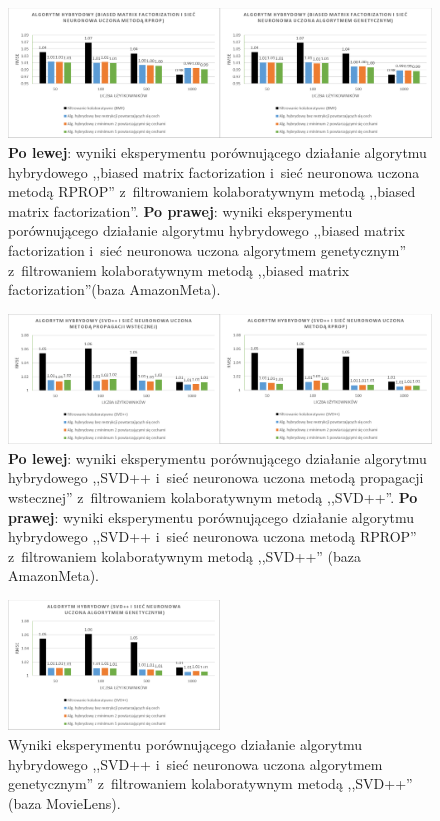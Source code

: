 \documentclass[twoside]{iisthesis}
\begin{document}
		\begin{figure}
			\centering
			\includegraphics[width=1\textwidth]{am_exphybrid2_3}			
			\caption{\textbf{Po lewej}: wyniki eksperymentu porównującego działanie algorytmu hybrydowego ,,biased matrix factorization i~sieć neuronowa uczona metodą RPROP'' z~filtrowaniem kolaboratywnym metodą ,,biased matrix factorization''. \textbf{Po prawej}: wyniki eksperymentu porównującego działanie algorytmu hybrydowego ,,biased matrix factorization i~sieć neuronowa uczona algorytmem genetycznym'' z~filtrowaniem kolaboratywnym metodą ,,biased matrix factorization''(baza AmazonMeta).}
			\label{fig:am_exphybrid2_3}
		\end{figure}
		
		\begin{figure}
			\centering
			\includegraphics[width=1\textwidth]{am_exphybrid2_4}			
			\caption{\textbf{Po lewej}: wyniki eksperymentu porównującego działanie algorytmu hybrydowego ,,SVD++ i~sieć neuronowa uczona metodą propagacji wstecznej'' z~filtrowaniem kolaboratywnym metodą ,,SVD++''. \textbf{Po prawej}: wyniki eksperymentu porównującego działanie algorytmu hybrydowego ,,SVD++ i~sieć neuronowa uczona metodą RPROP'' z~filtrowaniem kolaboratywnym metodą ,,SVD++'' (baza AmazonMeta).}
			\label{fig:am_exphybrid2_4}
		\end{figure}
		
		\begin{figure}
			\centering
			\includegraphics[width=0.5\textwidth]{am_exphybrid2_5}			
			\caption{Wyniki eksperymentu porównującego działanie algorytmu hybrydowego ,,SVD++ i~sieć neuronowa uczona algorytmem genetycznym'' z~filtrowaniem kolaboratywnym metodą ,,SVD++'' (baza MovieLens).}
			\label{fig:am_exphybrid2_5}
		\end{figure}
		
\end{document}
